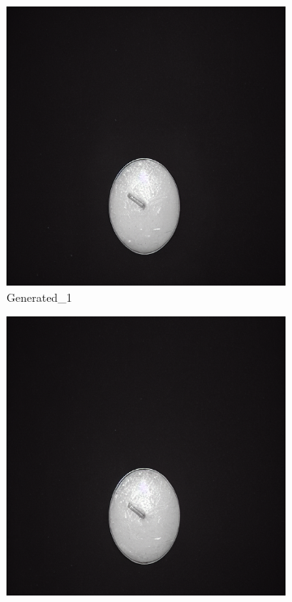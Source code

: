 \documentclass[12pt,DIV14,BCOR12mm,a4paper,footinclude=false,headinclude,parskip=half-,twoside,openright,cleardoublepage=empty,toc=index,bibliography=totoc,listof=totoc]{scrreprt}
\numberwithin{equation}{chapter}
\begin{document}
\begin{figure}
    \begin{minipage}[H]{\linewidth}
        \centering
        \begin{minipage}[H]{0.5\linewidth} %
            \centering
            \begin{subfigure}[t]{0.48\linewidth}
                \centering
                \includegraphics[width=\linewidth]{../media/candle_generated_1_1.png}
                \caption{Generated\_1}
            \end{subfigure}%
            \hfill
            \begin{subfigure}[t]{0.48\linewidth}
                \centering
                \includegraphics[width=\linewidth]{../media/candle_generated_1_2.png}

\end{subfigure}
\end{minipage}
\end{minipage}
\end{figure}
\end{document}
